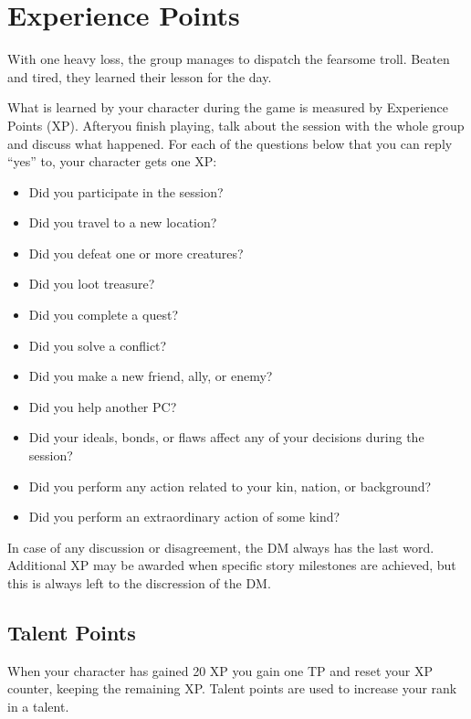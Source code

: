 \section{Experience Points}
With one heavy loss, the group manages to dispatch the fearsome troll.
Beaten and tired, they learned their lesson for the day.

What is learned by your character during the game is measured by Experience Points (XP).
Afteryou finish playing, talk about the session with the whole group and discuss what happened.
For each of the questions below that you can reply ``yes'' to, your character gets one XP:

\begin{itemize}
    \item Did you participate in the session?
    \item Did you travel to a new location?
    \item Did you defeat one or more creatures?
    \item Did you loot treasure?
    \item Did you complete a quest?
    \item Did you solve a conflict?
    \item Did you make a new friend, ally, or enemy?
    \item Did you help another PC?
    \item Did your ideals, bonds, or flaws affect any of your decisions during the session?
    \item Did you perform any action related to your kin, nation, or background?
    \item Did you perform an extraordinary action of some kind?
\end{itemize}

In case of any discussion or disagreement, the DM always has the last word.
Additional XP may be awarded when specific story milestones are achieved, but this is always left to the discression of the DM.

\subsection*{Talent Points}
When your character has gained 20 XP you gain one TP and reset your XP counter, keeping the remaining XP.
Talent points are used to increase your rank in a talent.

